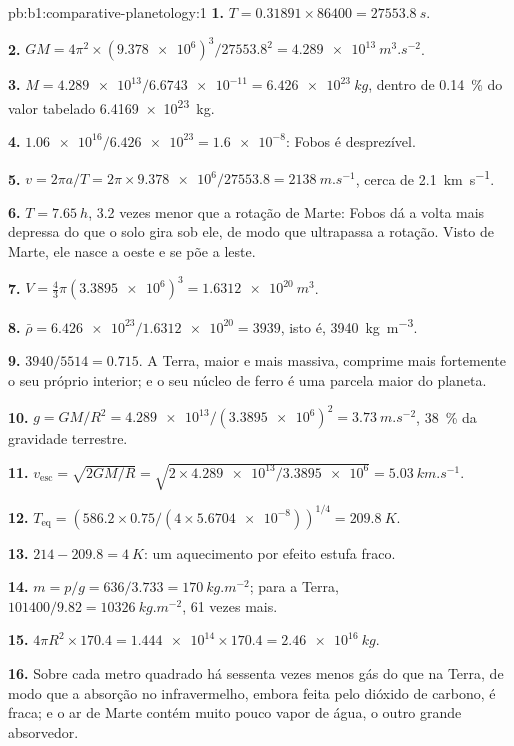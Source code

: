 \begin{solution}{pb:b1:comparative-planetology:1}
\textbf{1.} $T = 0.31891\times86400 = \qty{27553.8}{s}$.

\textbf{2.} $GM = 4\pi^2\times(\num{9.378e6})^3/\num{27553.8}^2 =
\qty{4.289e13}{m^3.s^{-2}}$.

\textbf{3.} $M = \num{4.289e13}/\num{6.6743e-11} = \qty{6.426e23}{kg}$,
dentro de \qty{0.14}{\percent} do valor tabelado \qty{6.4169e23}{kg}.

\textbf{4.} $\num{1.06e16}/\num{6.426e23} = \num{1.6e-8}$: Fobos é
desprezível.

\textbf{5.} $v = 2\pi a/T = 2\pi\times\num{9.378e6}/27553.8 =
\qty{2138}{m.s^{-1}}$, cerca de \qty{2.1}{km.s^{-1}}.

\textbf{6.} $T = \qty{7.65}{h}$, 3.2 vezes menor que a rotação de
Marte: Fobos dá a volta mais depressa do que o solo gira sob ele, de modo que
ultrapassa a rotação. Visto de Marte, ele nasce a oeste e se põe a leste.

\textbf{7.} $V = \tfrac43\pi(\num{3.3895e6})^3 = \qty{1.6312e20}{m^3}$.

\textbf{8.} $\bar\rho = \num{6.426e23}/\num{1.6312e20} = 3939$, isto é,
\qty{3940}{kg.m^{-3}}.

\textbf{9.} $3940/5514 = 0.715$. A Terra, maior e mais massiva,
comprime mais fortemente o seu próprio interior; e o seu núcleo de ferro é uma
parcela maior do planeta.

\textbf{10.} $g = GM/R^2 = \num{4.289e13}/(\num{3.3895e6})^2 =
\qty{3.73}{m.s^{-2}}$, \qty{38}{\percent} da gravidade terrestre.

\textbf{11.} $v_\mathrm{esc} = \sqrt{2GM/R} = \sqrt{2\times\num{4.289e13}/
\num{3.3895e6}} = \qty{5.03}{km.s^{-1}}$.

\textbf{12.} $T_\mathrm{eq} = (586.2\times0.75/(4\times\num{5.6704e-8}))^{1/4}
= \qty{209.8}{K}$.

\textbf{13.} $214 - 209.8 = \qty{4}{K}$: um aquecimento por efeito estufa fraco.

\textbf{14.} $m = p/g = 636/3.733 = \qty{170}{kg.m^{-2}}$; para a Terra,
$101400/9.82 = \qty{10326}{kg.m^{-2}}$, 61 vezes mais.

\textbf{15.} $4\pi R^2\times170.4 = \num{1.444e14}\times170.4 =
\qty{2.46e16}{kg}$.

\textbf{16.} Sobre cada metro quadrado há sessenta vezes menos gás do que na
Terra, de modo que a absorção no infravermelho, embora feita pelo dióxido de carbono, é fraca;
e o ar de Marte contém muito pouco vapor de água, o outro grande absorvedor.


\end{solution}
